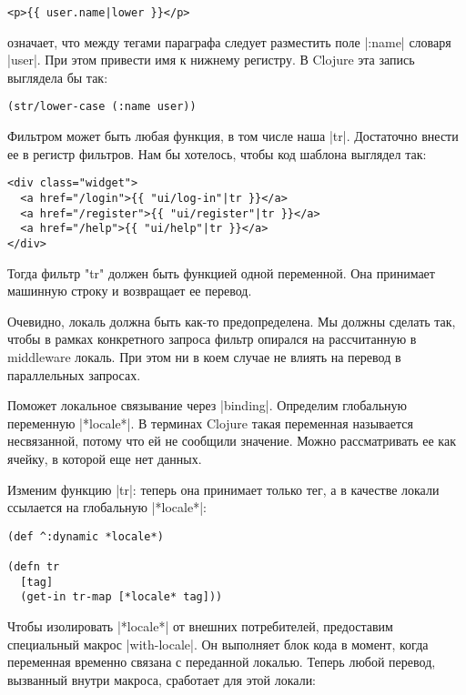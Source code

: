 {%
\begin{verbatim}
<p>{{ user.name|lower }}</p>
\end{verbatim}
{%

означает, что между тегами параграфа следует разместить поле \spverb|:name| словаря
\spverb|user|. При этом привести имя к нижнему регистру. В Clojure эта запись выглядела
бы так:

\begin{verbatim}
(str/lower-case (:name user))
\end{verbatim}


Фильтром может быть любая функция, в том числе наша \spverb|tr|. Достаточно внести ее в
регистр фильтров. Нам бы хотелось, чтобы код шаблона выглядел так:

{%
\begin{verbatim}
<div class="widget">
  <a href="/login">{{ "ui/log-in"|tr }}</a>
  <a href="/register">{{ "ui/register"|tr }}</a>
  <a href="/help">{{ "ui/help"|tr }}</a>
</div>
\end{verbatim}
{%

Тогда фильтр "tr" должен быть функцией одной переменной. Она принимает машинную
строку и возвращает ее перевод.

Очевидно, локаль должна быть как-то предопределена. Мы должны сделать так, чтобы
в рамках конкретного запроса фильтр опирался на рассчитанную в middleware
локаль. При этом ни в коем случае не влиять на перевод в параллельных запросах.

Поможет локальное связывание через \spverb|binding|. Определим глобальную переменную
\spverb|*locale*|. В терминах Clojure такая переменная называется несвязанной, потому
что ей не сообщили значение. Можно рассматривать ее как ячейку, в которой еще
нет данных.

Изменим функцию \spverb|tr|: теперь она принимает только тег, а в качестве локали
ссылается на глобальную \spverb|*locale*|:

\begin{verbatim}
(def ^:dynamic *locale*)

(defn tr
  [tag]
  (get-in tr-map [*locale* tag]))
\end{verbatim}

Чтобы изолировать \spverb|*locale*| от внешних потребителей, предоставим специальный
макрос \spverb|with-locale|. Он выполняет блок кода в момент, когда переменная временно
связана с переданной локалью. Теперь любой перевод, вызванный внутри макроса,
сработает для этой локали:

}}}}

